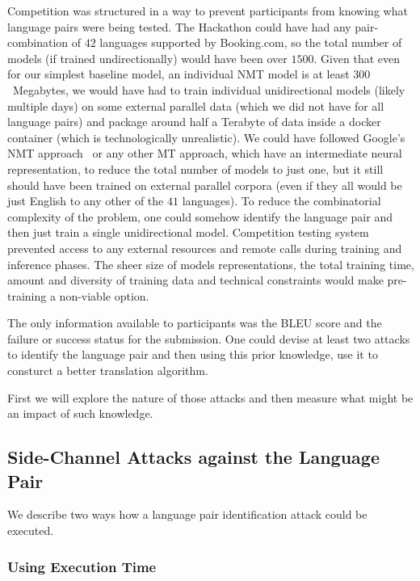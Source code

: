\documentclass[]{article}
\begin{document}
Competition was structured in a way to prevent participants from knowing what language pairs were being tested.
The Hackathon could have had any pair-combination of $42$ languages supported by {{Booking.com}}, so the total number of models (if trained undirectionally) would have been over $1500$.
Given that even for our simplest baseline model, an individual \ac{NMT} model is at least $300$~Megabytes, we would have had to train individual unidirectional models (likely multiple days) on some external parallel data (which we did not have for all language pairs) and package around half a Terabyte of data inside a docker container (which is technologically unrealistic).
We could have followed Google's \ac{NMT} approach~\citep{johnson2016google} or any other \ac{MT} approach, which have an intermediate neural representation, to reduce the total number of models to just one, but it still should have been trained on external parallel corpora (even if they all would be just English to any other of the $41$ languages).
To reduce the combinatorial complexity of the problem, one could somehow identify the language pair and then just train a single unidirectional model.
Competition testing system prevented access to any external resources and remote calls during training and inference phases.
The sheer size of models representations, the total training time, amount and diversity of training data and technical constraints would make pre-training a non-viable option.

The only information available to participants was the BLEU score and the failure or success status for the submission.
One could devise at least two attacks to identify the language pair and then using this prior knowledge, use it to consturct a better translation algorithm.

First we will explore the nature of those attacks and then measure what might be an impact of such knowledge.

\subsection{Side-Channel Attacks against the Language Pair}
\label{sect:attack}

We describe two ways how a language pair identification attack could be executed.

\subsubsection{Using Execution Time}
\end{document}
